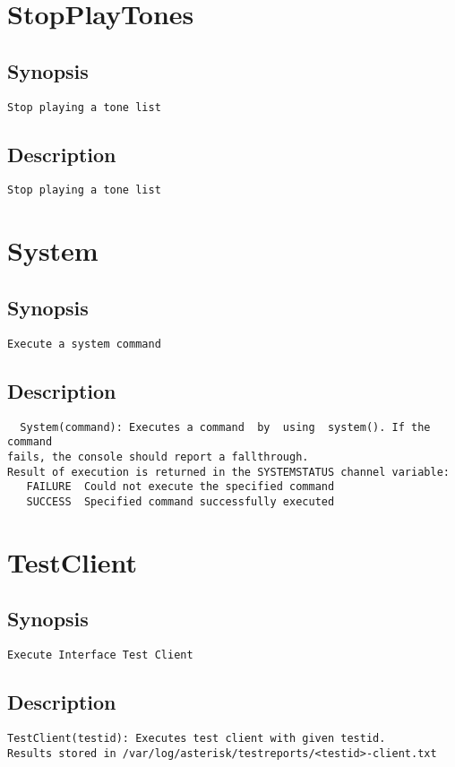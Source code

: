 \section{StopPlayTones}
\subsection{Synopsis}
\begin{verbatim}
Stop playing a tone list
\end{verbatim}
\subsection{Description}
\begin{verbatim}
Stop playing a tone list
\end{verbatim}


\section{System}
\subsection{Synopsis}
\begin{verbatim}
Execute a system command
\end{verbatim}
\subsection{Description}
\begin{verbatim}
  System(command): Executes a command  by  using  system(). If the command
fails, the console should report a fallthrough. 
Result of execution is returned in the SYSTEMSTATUS channel variable:
   FAILURE	Could not execute the specified command
   SUCCESS	Specified command successfully executed

\end{verbatim}


\section{TestClient}
\subsection{Synopsis}
\begin{verbatim}
Execute Interface Test Client
\end{verbatim}
\subsection{Description}
\begin{verbatim}
TestClient(testid): Executes test client with given testid.
Results stored in /var/log/asterisk/testreports/<testid>-client.txt
\end{verbatim}


